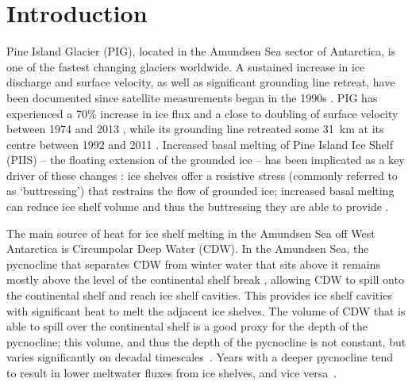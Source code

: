 \documentclass[draft]{agujournal2019}
\begin{document}
\section{Introduction}\label{S:Introduction}
Pine Island Glacier (PIG), located in the Amundsen Sea sector of Antarctica, is one of the fastest changing glaciers worldwide. A sustained increase in ice discharge and surface velocity, as well as significant grounding line retreat, have been documented since satellite measurements began in the 1990s \cite{Rignot2002AnnGlac, Rignot2008GRL, Rignot2011Science, Mouginot2014GRL, Gardner2018Cryo}. PIG has experienced a 70\% increase in ice flux and a close to doubling of surface velocity between 1974 and 2013 \cite{Mouginot2014GRL}, while its grounding line retreated some 31~km at its centre between 1992 and 2011 \cite{Rignot2014GRL}. Increased basal melting of Pine Island Ice Shelf (PIIS) -- the floating extension of the grounded ice -- has been implicated as a key driver of these changes \cite{Shepherd2004GRL, Pritchard2012Nature, Rignot2019PNAS}: ice shelves offer a resistive stress (commonly referred to as `buttressing') that restrains the flow of grounded ice; increased basal melting can reduce ice shelf volume and thus the buttressing they are able to provide \cite{Gudmundsson2013Cryo, Reese2018NatureClimCh, Gudmundsson2019GRL,Gagliardini2010GRL,Goldberg2019GRL, DeRydt2021Cryosphere}.

The main source of heat for ice shelf melting in the Amundsen Sea off West Antarctica is Circumpolar Deep Water (CDW). In the Amundsen Sea, the pycnocline that separates CDW from winter water that sits above it remains mostly above the level of the continental shelf break \cite{Jacobs2015Oceanography, Heywood2016Oceanography}, allowing CDW to spill onto the continental shelf and reach ice shelf cavities. This provides ice shelf cavities with significant heat to melt the adjacent ice shelves. The volume of CDW that is able to spill over the continental shelf is a good proxy for the depth of the pycnocline; this volume, and thus the depth of the pycnocline is not constant, but varies significantly on decadal timescales~\cite{Jenkins2018NatureGeo}. Years with a deeper pycnocline tend to result in lower meltwater fluxes from ice shelves, and vice versa~\cite{Jacobs2011NatureGeosci,Dutrieux2014Science}.
\end{document}
